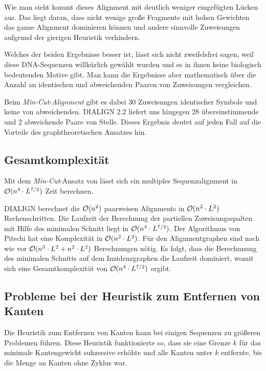 Wie man sieht kommt dieses Alignment mit deutlich weniger eingefügten Lücken aus. Das liegt daran, dass nicht wenige große Fragmente mit hohen Gewichten das ganze Alignment dominieren können und andere sinnvolle Zuweisungen aufgrund der gierigen Heuristik verhindern.

Welches der beiden Ergebnisse besser ist, lässt sich nicht zweifelsfrei sagen, weil diese DNA-Sequenzen willkürlich gewählt wurden und es in ihnen keine biologisch bedeutenden Motive gibt. Man kann die Ergebnisse aber mathematisch über die Anzahl an identischen und abweichenden Paaren von Zuweisungen vergleichen.

Beim \emph{Min-Cut-Alignment} gibt es dabei 30 Zuweisungen identischer Symbole und keine von abweichenden. DIALIGN 2.2 liefert uns hingegen 28 übereinstimmende und 2 abweichende Paare von Stelle. Dieses Ergebnis deutet auf jeden Fall auf die Vorteile des graphtheoretischen Ansatzes hin. 
 
\subsection{Gesamtkomplexität}

\begin{korollar}
	Mit dem \emph{Min-Cut}-Ansatz von \cite{cpm10} lässt sich ein multiples Sequenzalignment in $\mathcal{O}(n^4\cdot L^{7/2})$ Zeit berechnen.
\end{korollar}

\begin{beweis}
	DIALIGN berechnet die $\mathcal{O}(n^2)$ paarweisen Alignments in $\mathcal{O}(n^2\cdot L^2)$ Rechenschritten. Die Laufzeit der Berechnung der partiellen Zuweisungsspalten mit Hilfe des minimalen Schnitt liegt in $\mathcal{O}(n^4\cdot L^{7/2})$. Der Algorithmus von Pitschi hat eine Komplexität in $\mathcal{O}(n^2\cdot L^2)$. Für den Alignmentgraphen sind nach wie vor $\mathcal{O}(n^3\cdot L^2 + n^2\cdot L^2)$ Berechnungen nötig. Es folgt, dass die Berechnnung des minimalen Schnitts auf dem Inzidenzgraphen die Laufzeit dominiert, womit sich eine Gesamtkomplexität von $\mathcal{O}(n^4\cdot L^{7/2})$ ergibt.
\end{beweis}

\subsection{Probleme bei der Heuristik zum Entfernen von Kanten}

Die Heuristik zum Entfernen von Kanten kann bei einigen Sequenzen zu größeren Problemen führen. Diese Heuristik funktionierte so, dass sie eine Grenze $k$ für das minimale Kantengewicht sukzessive erhöhte und alle Kanten unter $k$ entfernte, bis die Menge an Kanten ohne Zyklus war. 

